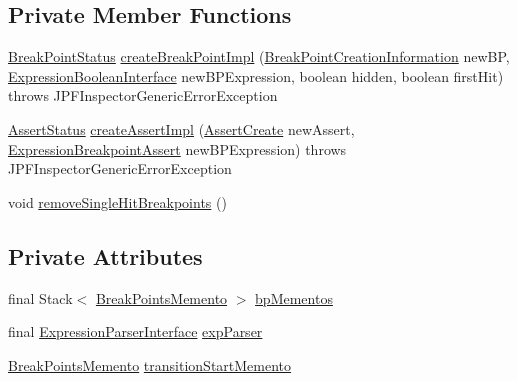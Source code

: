 \subsection*{Private Member Functions}
\begin{DoxyCompactItemize}
\item 
\hyperlink{interfacegov_1_1nasa_1_1jpf_1_1inspector_1_1interfaces_1_1_break_point_status}{Break\+Point\+Status} \hyperlink{classgov_1_1nasa_1_1jpf_1_1inspector_1_1server_1_1breakpoints_1_1_break_point_handler_a50974468467b1634ee0301e97d9c8f4e}{create\+Break\+Point\+Impl} (\hyperlink{interfacegov_1_1nasa_1_1jpf_1_1inspector_1_1interfaces_1_1_break_point_creation_information}{Break\+Point\+Creation\+Information} new\+BP, \hyperlink{interfacegov_1_1nasa_1_1jpf_1_1inspector_1_1server_1_1expression_1_1_expression_boolean_interface}{Expression\+Boolean\+Interface} new\+B\+P\+Expression, boolean hidden, boolean first\+Hit)  throws J\+P\+F\+Inspector\+Generic\+Error\+Exception 
\item 
\hyperlink{interfacegov_1_1nasa_1_1jpf_1_1inspector_1_1interfaces_1_1_assert_status}{Assert\+Status} \hyperlink{classgov_1_1nasa_1_1jpf_1_1inspector_1_1server_1_1breakpoints_1_1_break_point_handler_ad2cdb2e29a452f69836bce26e8c924a0}{create\+Assert\+Impl} (\hyperlink{interfacegov_1_1nasa_1_1jpf_1_1inspector_1_1interfaces_1_1_assert_create}{Assert\+Create} new\+Assert, \hyperlink{classgov_1_1nasa_1_1jpf_1_1inspector_1_1server_1_1expression_1_1expressions_1_1_expression_breakpoint_assert}{Expression\+Breakpoint\+Assert} new\+B\+P\+Expression)  throws J\+P\+F\+Inspector\+Generic\+Error\+Exception 
\item 
void \hyperlink{classgov_1_1nasa_1_1jpf_1_1inspector_1_1server_1_1breakpoints_1_1_break_point_handler_ad1ca2ffd97ea8192b9e253f6e6c765a2}{remove\+Single\+Hit\+Breakpoints} ()
\end{DoxyCompactItemize}
\subsection*{Private Attributes}
\begin{DoxyCompactItemize}
\item 
final Stack$<$ \hyperlink{classgov_1_1nasa_1_1jpf_1_1inspector_1_1server_1_1breakpoints_1_1_break_point_handler_1_1_break_points_memento}{Break\+Points\+Memento} $>$ \hyperlink{classgov_1_1nasa_1_1jpf_1_1inspector_1_1server_1_1breakpoints_1_1_break_point_handler_a8126a85baf407a92fa5369202d966408}{bp\+Mementos}
\item 
final \hyperlink{interfacegov_1_1nasa_1_1jpf_1_1inspector_1_1server_1_1expression_1_1_expression_parser_interface}{Expression\+Parser\+Interface} \hyperlink{classgov_1_1nasa_1_1jpf_1_1inspector_1_1server_1_1breakpoints_1_1_break_point_handler_a2e53a189babb994c66b8f09315243934}{exp\+Parser}
\item 
\hyperlink{classgov_1_1nasa_1_1jpf_1_1inspector_1_1server_1_1breakpoints_1_1_break_point_handler_1_1_break_points_memento}{Break\+Points\+Memento} \hyperlink{classgov_1_1nasa_1_1jpf_1_1inspector_1_1server_1_1breakpoints_1_1_break_point_handler_ab03b8dcde0887de59f690b844766d59f}{transition\+Start\+Memento}
\end{DoxyCompactItemize}
